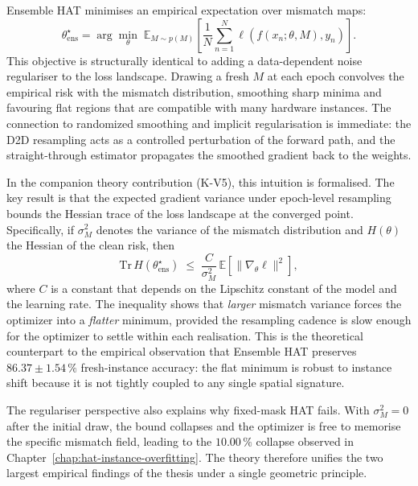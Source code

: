 Ensemble HAT minimises an empirical expectation over mismatch maps:
\begin{equation}
    \theta_{\mathrm{ens}}^{\star}
    = \arg\min_{\theta}\;
    \mathbb{E}_{M\sim p(M)}\!\left[
        \frac{1}{N}\sum_{n=1}^{N}
        \ell\!\left(f(x_{n};\theta,M),y_{n}\right)
    \right].
    \label{eq:ens-hat-repeat}
\end{equation}
This objective is structurally identical to adding a data-dependent noise regulariser to the loss landscape.  Drawing a fresh $M$ at each epoch convolves the empirical risk with the mismatch distribution, smoothing sharp minima and favouring flat regions that are compatible with many hardware instances.  The connection to randomized smoothing and implicit regularisation is immediate: the D2D resampling acts as a controlled perturbation of the forward path, and the straight-through estimator propagates the smoothed gradient back to the weights.

In the companion theory contribution (K-V5), this intuition is formalised.  The key result is that the expected gradient variance under epoch-level resampling bounds the Hessian trace of the loss landscape at the converged point.  Specifically, if $\sigma_{M}^{2}$ denotes the variance of the mismatch distribution and $H(\theta)$ the Hessian of the clean risk, then
\begin{equation}
    \mathrm{Tr}\,H(\theta_{\mathrm{ens}}^{\star})
    \;\le\;
    \frac{C}{\sigma_{M}^{2}}\,
    \mathbb{E}\!\left[\|\nabla_{\theta}\ell\|^{2}\right],
    \label{eq:hessian-bound}
\end{equation}
where $C$ is a constant that depends on the Lipschitz constant of the model and the learning rate.  The inequality shows that \emph{larger} mismatch variance forces the optimizer into a \emph{flatter} minimum, provided the resampling cadence is slow enough for the optimizer to settle within each realisation.  This is the theoretical counterpart to the empirical observation that Ensemble HAT preserves $86.37\pm1.54\,\%$ fresh-instance accuracy: the flat minimum is robust to instance shift because it is not tightly coupled to any single spatial signature.

The regulariser perspective also explains why fixed-mask HAT fails.  With $\sigma_{M}^{2}=0$ after the initial draw, the bound collapses and the optimizer is free to memorise the specific mismatch field, leading to the $10.00\,\%$ collapse observed in Chapter~\ref{chap:hat-instance-overfitting}.  The theory therefore unifies the two largest empirical findings of the thesis under a single geometric principle.

